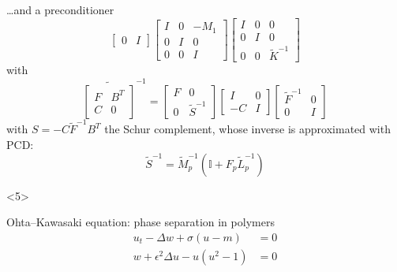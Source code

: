 \documentclass[presentation,aspectratio=43, 10pt]{beamer}
\begin{document}
\begin{frame}[t]
\begin{onlyenv}
\begin{block}{\dots and a preconditioner}
{\begin{equation*}
\begin{bmatrix}
            0 & I
          \end{bmatrix}
          \begin{bmatrix}
            I & 0 & -M_1\\
            0 & I & 0 \\
            0 & 0 & I
          \end{bmatrix}
          \begin{bmatrix}
            I & 0 & 0\\
            0 & I & 0\\
            0 & 0 & \tilde{K}^{-1}
          \end{bmatrix}
        \end{equation*}
        with
        \begin{equation*}
          \widetilde{\begin{bmatrix}
              F & B^T\\
              C & 0
            \end{bmatrix}}^{-1} = \begin{bmatrix}
            F & 0 \\
            0 & \tilde{S}^{-1}
          \end{bmatrix}
          \begin{bmatrix}
            I & 0\\
            -C & I
          \end{bmatrix}
          \begin{bmatrix}
            \tilde{F}^{-1} & 0 \\
            0 & I
          \end{bmatrix}
        \end{equation*}
        with $S = -C \tilde{F}^{-1} B^T$ the Schur complement, whose
        inverse is approximated with PCD:
        \begin{equation*}
          \tilde{S}^{-1} = \tilde{M}_p^{-1}(\mathbb{I} + F_p \tilde{L}_p^{-1})
        \end{equation*}
      }
    \end{block}
  \end{onlyenv}
  \begin{onlyenv}<5>
    \begin{block}{Ohta--Kawasaki equation: phase separation in
        polymers}
      \begin{equation*}
        \begin{split}
          u_t - \Delta w + \sigma(u - m) &= 0\\
          w + \epsilon^2 \Delta u - u(u^2 - 1) &= 0

\end{split}
\end{equation*}
\end{block}
\end{onlyenv}
\end{frame}
\end{document}
